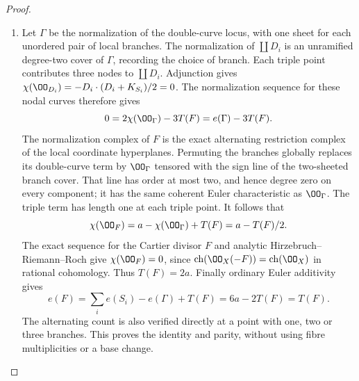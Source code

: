 \begin{proof}
\begin{enumerate}[label={$\langle1\rangle$\arabic*.},leftmargin=*]
\item Let $\Gamma$ be the normalization of the double-curve locus, with one
sheet for each unordered pair of local branches. The normalization of
$\coprod D_i$ is an unramified degree-two cover of $\Gamma$, recording
the choice of branch. Each triple point contributes three nodes to
$\coprod D_i$. Adjunction gives
$\chi(\OO_{D_i})=-D_i\cdot(D_i+K_{S_i})/2=0$. The normalization
sequence for these nodal curves therefore gives
\[
 0=2\chi(\OO_\Gamma)-3T(F)=e(\Gamma)-3T(F).
\]
The normalization complex of $F$ is the exact alternating restriction
complex of the local coordinate hyperplanes. Permuting the branches
globally replaces its double-curve term by $\OO_\Gamma$ tensored with
the sign line of the two-sheeted branch cover. That line has order at
most two, and hence degree zero on every component; it has the same
coherent Euler characteristic as $\OO_\Gamma$. The triple term has
length one at each triple point. It follows that
\[
 \chi(\OO_F)=a-\chi(\OO_\Gamma)+T(F)=a-T(F)/2.
\]
The exact sequence for the Cartier divisor $F$ and analytic
Hirzebruch--Riemann--Roch give $\chi(\OO_F)=0$, since
$\operatorname{ch}(\OO_X(-F))=\operatorname{ch}(\OO_X)$ in rational
cohomology. Thus $T(F)=2a$. Finally ordinary Euler additivity gives
\[
 e(F)=\sum_i e(S_i)-e(\Gamma)+T(F)=6a-2T(F)=T(F).
\]
The alternating count is also verified directly at a point with one,
two or three branches. This proves the identity and parity, without
using fibre multiplicities or a base change.

\end{enumerate}
\end{proof}